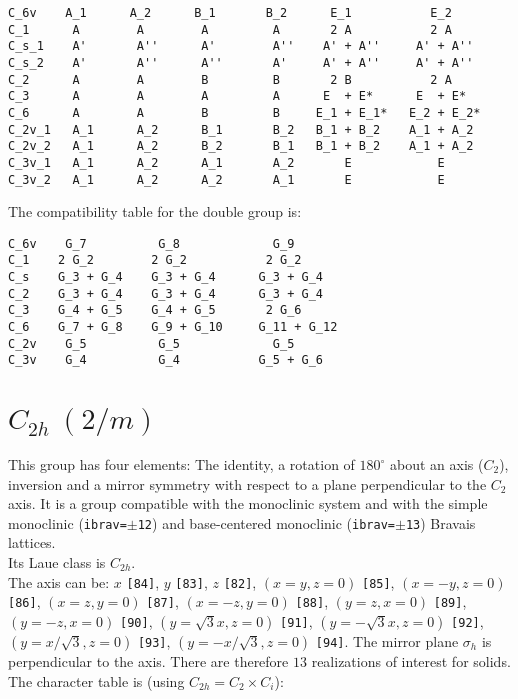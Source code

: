 \documentclass[12pt,a4paper,twoside]{report}
\begin{document}
\begin{tcolorbox}
\begin{footnotesize}
\begin{verbatim}
C_6v    A_1      A_2      B_1       B_2      E_1           E_2
C_1      A        A        A         A       2 A           2 A
C_s_1    A'       A''      A'        A''    A' + A''     A' + A''
C_s_2    A'       A''      A''       A'     A' + A''     A' + A''
C_2      A        A        B         B       2 B           2 A
C_3      A        A        A         A      E  + E*      E  + E*
C_6      A        A        B         B     E_1 + E_1*   E_2 + E_2*
C_2v_1   A_1      A_2      B_1       B_2   B_1 + B_2    A_1 + A_2
C_2v_2   A_1      A_2      B_2       B_1   B_1 + B_2    A_1 + A_2
C_3v_1   A_1      A_2      A_1       A_2       E            E  
C_3v_2   A_1      A_2      A_2       A_1       E            E
\end{verbatim}
\end{footnotesize}
\end{tcolorbox}

The compatibility table for the double group is:

\begin{tcolorbox}
\begin{footnotesize}
\begin{verbatim}
C_6v    G_7          G_8             G_9
C_1    2 G_2        2 G_2           2 G_2
C_s    G_3 + G_4    G_3 + G_4      G_3 + G_4
C_2    G_3 + G_4    G_3 + G_4      G_3 + G_4
C_3    G_4 + G_5    G_4 + G_5       2 G_6
C_6    G_7 + G_8    G_9 + G_10     G_11 + G_12
C_2v    G_5          G_5             G_5
C_3v    G_4          G_4           G_5 + G_6
\end{verbatim}
\end{footnotesize}
\end{tcolorbox}

\newpage
{\color{coral}\section{$C_{2h}\ (2/m)$}} 
\color{black}
This group has four elements: The identity, a rotation of $180^\circ$ 
about an axis ($C_2$), inversion and a mirror symmetry with respect to 
a plane perpendicular to the $C_2$ axis.
It is a group compatible with the monoclinic system and with the  
simple monoclinic (\texttt{ibrav=$\pm$12}) and base-centered monoclinic
(\texttt{ibrav=$\pm$13}) Bravais lattices. \\ 
Its Laue class is $C_{2h}$. \\
The axis can be:
$x$ \texttt{[84]}, $y$ \texttt{[83]}, $z$ \texttt{[82]}, 
$(x=y, z=0)$ \texttt{[85]}, $(x=-y, z=0)$ \texttt{[86]}, 
$(x=z, y=0)$ \texttt{[87]}, $(x=-z, y=0)$ \texttt{[88]},
$(y=z, x=0)$ \texttt{[89]}, 
$(y=-z, x=0)$ \texttt{[90]}, $(y=\sqrt{3}x, z=0)$ \texttt{[91]}, 
$(y=-\sqrt{3}x, z=0)$ \texttt{[92]},
$(y=x/\sqrt{3}, z=0)$ \texttt{[93]}, 
$(y=-x/\sqrt{3}, z=0)$ \texttt{[94]}. The mirror plane $\sigma_h$ 
is perpendicular to the axis. There are therefore $13$ realizations 
of interest for solids. \\
The character table is (using $C_{2h}=C_2 \times C_i$):
\end{document}
